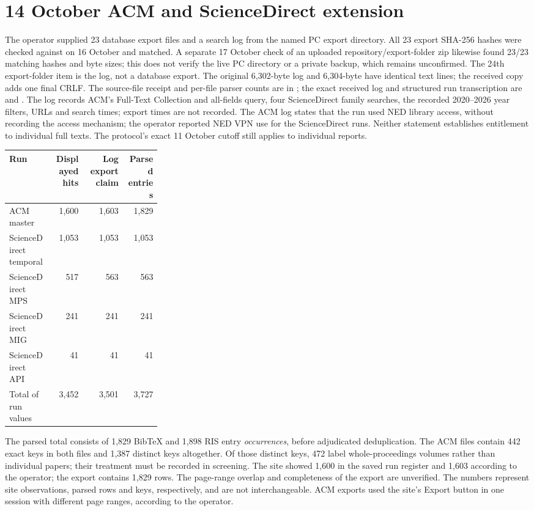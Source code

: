 \documentclass[12pt,a4paper]{article}
\begin{document}
\section{14 October ACM and ScienceDirect extension}
The operator supplied 23 database export files and a search log from the named PC export directory. All 23 export SHA-256 hashes were checked against  on 16 October and matched. A separate 17 October check of an uploaded repository/export-folder zip likewise found 23/23 matching hashes and byte sizes; this does not verify the live PC directory or a private backup, which remains unconfirmed. The 24th export-folder item is the log, not a database export. The original 6,302-byte log and 6,304-byte  have identical text lines; the received copy adds one final CRLF. The source-file receipt and per-file parser counts are in ; the exact received log and structured run transcription are  and . The log records ACM's Full-Text Collection and all-fields query, four ScienceDirect family searches, the recorded 2020--2026 year filters, URLs and search times; export times are not recorded. The ACM log states that the run used NED library access, without recording the access mechanism; the operator reported NED VPN use for the ScienceDirect runs. Neither statement establishes entitlement to individual full texts. The protocol's exact 11 October cutoff still applies to individual reports.

\begin{longtable}{P{0.29\linewidth}rrr}
\toprule Run & Displayed hits & Log export claim & Parsed entries\\\midrule\endhead
ACM master &1,600&1,603&1,829\\
ScienceDirect temporal &1,053&1,053&1,053\\
ScienceDirect MPS &517&563&563\\
ScienceDirect MIG &241&241&241\\
ScienceDirect API &41&41&41\\
\midrule Total of run values &3,452&3,501&3,727\\
\bottomrule\end{longtable}
The parsed total consists of 1,829 BibTeX and 1,898 RIS entry \emph{occurrences}, before adjudicated deduplication. The ACM files contain 442 exact keys in both files and 1,387 distinct keys altogether. Of those distinct keys, 472 label whole-proceedings volumes rather than individual papers; their treatment must be recorded in screening. The site showed 1,600 in the saved run register and 1,603 according to the operator; the export contains 1,829 rows. The page-range overlap and completeness of the export are unverified. The numbers represent site observations, parsed rows and keys, respectively, and are not interchangeable. ACM exports used the site's Export button in one session with different page ranges, according to the operator.
\end{document}
